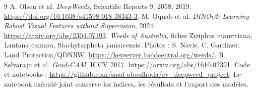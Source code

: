 \documentclass[10pt,a4paper]{article}
\begin{document}
\vspace{-3pt}
\begin{thebibliography}{9}\footnotesize\setlength{\itemsep}{0pt}
 A. Olsen et al. \textit{DeepWeeds}, Scientific Reports 9, 2058, 2019. \url{https://doi.org/10.1038/s41598-018-38343-3}.
 M. Oquab et al. \textit{DINOv2: Learning Robust Visual Features without Supervision}, 2024. \url{https://arxiv.org/abs/2304.07193}.
 \textit{Weeds of Australia}, fiches Ziziphus mauritiana, Lantana camara, Stachytarpheta jamaicensis. Photos : S. Navie, C. Gardiner, Land Protection/QDNRW. \url{https://keyserver.lucidcentral.org/weeds/}.
 R. Selvaraju et al. \textit{Grad-CAM}, ICCV 2017. \url{https://arxiv.org/abs/1610.02391}.
 Code et notebooks : \url{https://github.com/saad-aboulhoda/cv_deepweed_project}. Le notebook exécuté joint conserve les indices, les résultats et l'export des modèles.
\end{thebibliography}
\end{document}
